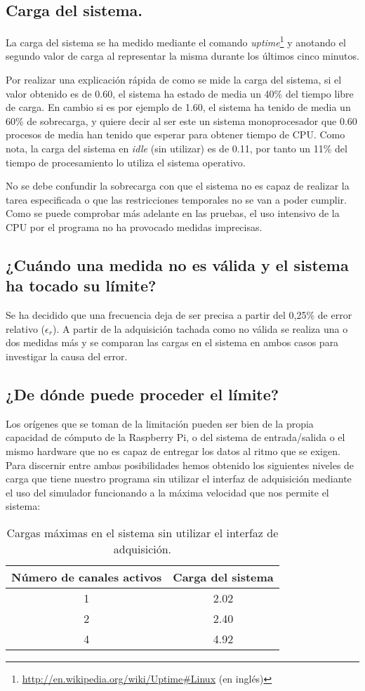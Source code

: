 \subsection{Carga del sistema.}
	 La carga del sistema se ha medido mediante el comando \emph{uptime}\footnote{\url{http://en.wikipedia.org/wiki/Uptime\#Linux} (en inglés)} y anotando el segundo valor de carga al representar la misma durante los últimos cinco minutos. 
	 
	 Por realizar una explicación rápida de como se mide la carga del sistema, si el valor obtenido es de 0.60, el sistema ha estado de media un 40\% del tiempo libre de carga. En cambio si es por ejemplo de 1.60, el sistema ha tenido de media un 60\% de sobrecarga, y quiere decir al ser este un sistema monoprocesador que 0.60 procesos de media han tenido que esperar para obtener tiempo de CPU\cite{wikipedia_cpuload}. Como nota, la carga del sistema en \emph{idle} (sin utilizar) es de 0.11, por tanto un 11\% del tiempo de procesamiento lo utiliza el sistema operativo.
	 
	 No se debe confundir la sobrecarga con que el sistema no es capaz de realizar la tarea especificada o que las restricciones temporales no se van a poder cumplir. Como se puede comprobar más adelante en las pruebas, el uso intensivo de la CPU por el programa no ha provocado medidas imprecisas.
	 
	 \subsection{¿Cuándo una medida no es válida y el sistema ha tocado su límite?}
	Se ha decidido que una frecuencia deja de ser precisa a partir del 0,25\% de error relativo ($ \epsilon_r$). A partir de la adquisición tachada como no válida se realiza una o dos medidas más y se comparan las cargas en el sistema en ambos casos para investigar la causa del error.
	 
	\subsection{¿De dónde puede proceder el límite?}	 
	 Los orígenes que se toman de la limitación pueden ser bien de la propia capacidad de cómputo de la Raspberry Pi, o del sistema de entrada/salida o el mismo hardware que no es capaz de entregar los datos al ritmo que se exigen. Para discernir entre ambas posibilidades hemos obtenido los siguientes niveles de carga que tiene nuestro programa sin utilizar el interfaz de adquisición mediante el uso del simulador funcionando a la máxima velocidad que nos permite el sistema:
\begin{table}[!ht]
  \centering
  \begin{tabular}{| c | c |}
  	\hline
    Número de canales activos & Carga del sistema \\ \hline
	1 			&	2.02	\\ \hline
	2 			&	2.40	\\ \hline
	4 			&	4.92	\\ \hline
  \end{tabular}
  \caption{Cargas máximas en el sistema sin utilizar el interfaz de adquisición.}
  \label{tab:test_cargas_sim}
\end{table}
	
